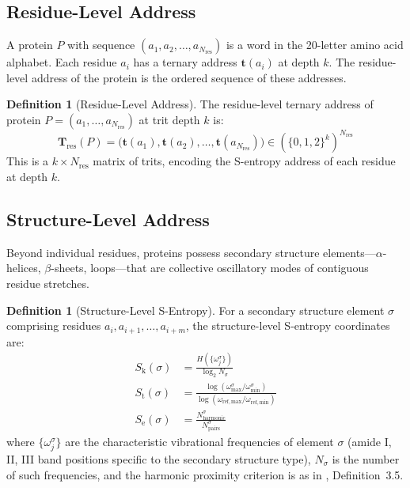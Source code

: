 \documentclass[11pt,twocolumn,a4paper]{article}
\theoremstyle{definition}
\newtheorem{definition}[theorem]{Definition}
\theoremstyle{remark}
\newcommand{\Sk}{S_{\mathrm{k}}}
\newcommand{\St}{S_{\mathrm{t}}}
\newcommand{\Se}{S_{\mathrm{e}}}
\newcommand{\Nres}{N_{\mathrm{res}}}
\begin{document}
\subsection{Residue-Level Address}

A protein $P$ with sequence $(a_1, a_2, \ldots, a_{\Nres})$ is a word in the 20-letter amino acid alphabet. Each residue $a_i$ has a ternary address $\mathbf{t}(a_i)$ at depth $k$. The residue-level address of the protein is the ordered sequence of these addresses.

\begin{definition}[Residue-Level Address]
\label{def:residue_address}
The residue-level ternary address of protein $P = (a_1, \ldots, a_{\Nres})$ at trit depth $k$ is:
\begin{equation}
\mathbf{T}_{\mathrm{res}}(P) = \bigl(\mathbf{t}(a_1), \mathbf{t}(a_2), \ldots, \mathbf{t}(a_{\Nres})\bigr) \in (\{0,1,2\}^k)^{\Nres}
\end{equation}
This is a $k \times \Nres$ matrix of trits, encoding the S-entropy address of each residue at depth $k$.
\end{definition}

\subsection{Structure-Level Address}

Beyond individual residues, proteins possess secondary structure elements---$\alpha$-helices, $\beta$-sheets, loops---that are collective oscillatory modes of contiguous residue stretches.

\begin{definition}[Structure-Level S-Entropy]
\label{def:structure_entropy}
For a secondary structure element $\sigma$ comprising residues $a_i, a_{i+1}, \ldots, a_{i+m}$, the structure-level S-entropy coordinates are:
\begin{align}
\Sk(\sigma) &= \frac{H(\{\omega_j^\sigma\})}{\log_2 N_\sigma} \label{eq:sk_structure} \\
\St(\sigma) &= \frac{\log(\omega_{\max}^\sigma / \omega_{\min}^\sigma)}{\log(\omega_{\mathrm{ref,max}} / \omega_{\mathrm{ref,min}})} \label{eq:st_structure} \\
\Se(\sigma) &= \frac{N_{\mathrm{harmonic}}^\sigma}{N_{\mathrm{pairs}}^\sigma} \label{eq:se_structure}
\end{align}
where $\{\omega_j^\sigma\}$ are the characteristic vibrational frequencies of element $\sigma$ (amide I, II, III band positions specific to the secondary structure type), $N_\sigma$ is the number of such frequencies, and the harmonic proximity criterion is as in \citet{sachikonye2025a}, Definition~3.5.
\end{definition}
\end{document}

